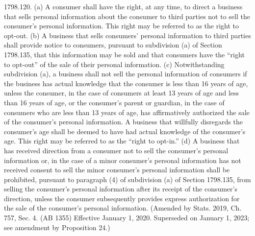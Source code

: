 1798.120.  (a) A consumer shall have the right, at any time, to direct a business that sells personal information about the consumer to third parties not to sell the consumer’s personal information. This right may be referred to as the right to opt-out.
(b) A business that sells consumers’ personal information to third parties shall provide notice to consumers, pursuant to subdivision (a) of Section 1798.135, that this information may be sold and that consumers have the “right to opt-out” of the sale of their personal information.
(c) Notwithstanding subdivision (a), a business shall not sell the personal information of consumers if the business has actual knowledge that the consumer is less than 16 years of age, unless the consumer, in the case of consumers at least 13 years of age and less than 16 years of age, or the consumer’s parent or guardian, in the case of consumers who are less than 13 years of age, has affirmatively authorized the sale of the consumer’s personal information. A business that willfully disregards the consumer’s age shall be deemed to have had actual knowledge of the consumer’s age. This right may be referred to as the “right to opt-in.”
(d) A business that has received direction from a consumer not to sell the consumer’s personal information or, in the case of a minor consumer’s personal information has not received consent to sell the minor consumer’s personal information shall be prohibited, pursuant to paragraph (4) of subdivision (a) of Section 1798.135, from selling the consumer’s personal information after its receipt of the consumer’s direction, unless the consumer subsequently provides express authorization for the sale of the consumer’s personal information.
(Amended by Stats. 2019, Ch. 757, Sec. 4. (AB 1355) Effective January 1, 2020. Superseded on January 1, 2023; see amendment by Proposition 24.)


